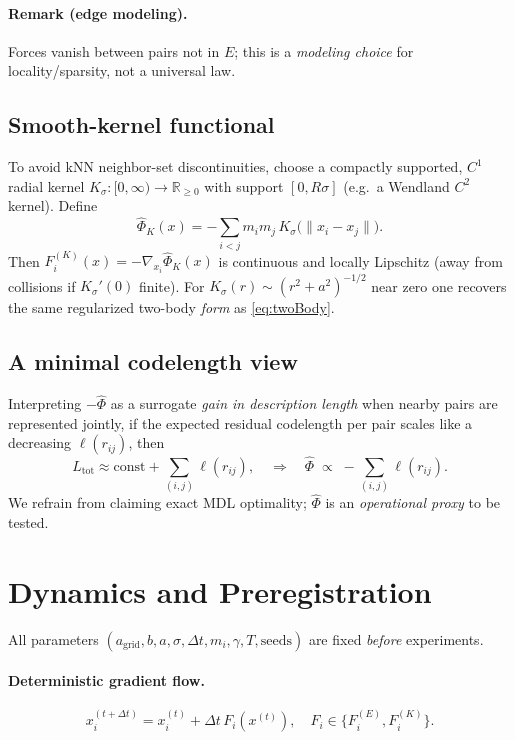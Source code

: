 \documentclass[11pt,a4paper]{article}
\numberwithin{equation}{section}
\newcommand{\R}{\mathbb{R}}
\begin{document}
\paragraph{Remark (edge modeling).} Forces vanish between pairs not in $E$; this is a \emph{modeling choice} for locality/sparsity, not a universal law.

\subsection{Smooth-kernel functional}
To avoid kNN neighbor-set discontinuities, choose a compactly supported, $C^1$ radial kernel $K_\sigma:[0,\infty)\to\R_{\ge 0}$ with support $[0,R\sigma]$ (e.g.\ a Wendland $C^2$ kernel). Define
\begin{equation}
\label{eq:phiK}
\widehat{\Phi}_K(x)= -\sum_{i<j} m_im_j\,K_\sigma\!\big(\lVert x_i-x_j\rVert\big).
\end{equation}
Then $F^{(K)}_i(x)=-\nabla_{x_i}\widehat{\Phi}_K(x)$ is continuous and locally Lipschitz (away from collisions if $K_\sigma'(0)$ finite). For $K_\sigma(r)\sim (r^2+a^2)^{-1/2}$ near zero one recovers the same regularized two-body \emph{form} as \eqref{eq:twoBody}.

\subsection{A minimal codelength view}
Interpreting $-\widehat{\Phi}$ as a surrogate \emph{gain in description length} when nearby pairs are represented jointly, if the expected residual codelength per pair scales like a decreasing $\ell(r_{ij})$, then
\[
L_{\text{tot}} \approx \text{const} + \sum_{(i,j)} \ell(r_{ij}),
\quad\Rightarrow\quad
\widehat{\Phi}\;\propto\; -\sum_{(i,j)} \ell(r_{ij}).
\]
We refrain from claiming exact MDL optimality; $\widehat{\Phi}$ is an \emph{operational proxy} to be tested.

\section{Dynamics and Preregistration}
All parameters $(a_{\text{grid}},b,a,\sigma, \Delta t, m_i,\gamma,T,\text{seeds})$ are fixed \emph{before} experiments.

\paragraph{Deterministic gradient flow.}
\begin{equation}
x_i^{(t+\Delta t)}=x_i^{(t)}+\Delta t\,F_i(x^{(t)}),\quad 
F_i\in\{F^{(E)}_i,F^{(K)}_i\}.
\end{equation}
\end{document}
